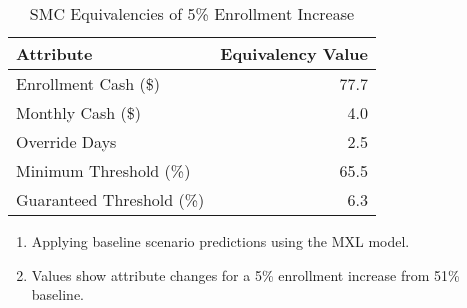 \begin{table}[H]
\centering
\caption{SMC Equivalencies of 5\% Enrollment Increase}
\setlength{\tabcolsep}{2.5em}

\newsavebox{\myTableBoxA}
\begin{lrbox}{\myTableBoxA}
\begin{tabular}{lr}
\toprule
\textbf{Attribute} & \textbf{Equivalency Value} \\
\midrule
Enrollment Cash (\$) & 77.7 \\
Monthly Cash (\$) & 4.0 \\
Override Days & 2.5 \\
Minimum Threshold (\%) & 65.5 \\
Guaranteed Threshold (\%) & 6.3 \\
\bottomrule
\end{tabular}
\end{lrbox}

\usebox{\myTableBoxA}

\vspace{0.5em}
\begin{minipage}{\wd\myTableBoxA}
\footnotesize
\begin{enumerate}[leftmargin=2em]  %
\item Applying baseline scenario predictions using the MXL model.
\item Values show attribute changes for a 5\% enrollment increase from 51\% baseline.
\end{enumerate}
\end{minipage}
\label{table_smc_equiv}
\end{table}
